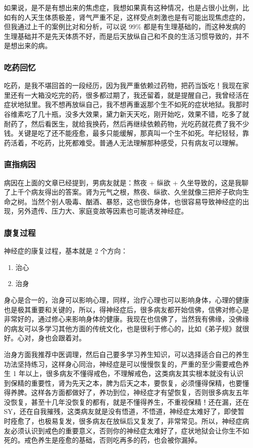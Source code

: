 \documentclass{ctexart}
\begin{document}
如果说，是不是有想出来的焦虑症，我想如果真有这种情况，也是占很小比例，比如有的人天生体质极差，肾气严重不足，这样受点刺激也是有可能出现焦虑症的，但我通过上千的案例比对和分析，可以说 99\% 都是有生理基础的，而这种发病的生理基础并不是先天体质不好，而是后天放纵自己和不良的生活习惯导致的，并不是想出来的病。

\subsubsection{吃药回忆}

吃药，是我不堪回首的一段经历，因为我严重依赖过药物，把药当饭吃！我现在家里还有一大箱没吃完的药，很多都过期了，我还留着，就是提醒自己，我曾经活在症状地狱里。我不想再放纵自己，我不想再重返那个生不如死的症状地狱。我那时谷维素吃了几十瓶，没多大效果，黛力新天天吃，刚开始吃，效果不错，吃多了就耐药了，然后看医生，就给我换药，然后再继续依赖药物，光吃药就花费了我不少钱。关键是吃了还不能痊愈，最多只能缓解，那真叫一个生不如死。年纪轻轻，靠药活着，不吃药，比死都难受。普通人无法理解那种感受，只有病友可以理解。

\subsubsection{直指病因}

病因在上面的文章已经提到，男病友就是：熬夜 + 纵欲 + 久坐导致的，这是我聊了上千个病友得出的答案。肾为元气之根，熬夜、纵欲、久坐就像三把斧子砍向生命之树。当然个别人吸毒、酗酒、暴怒，这也很伤身体，也很容易导致神经症的出现，另外遗传、压力大、家庭变故等因素也可能诱发神经症。

\subsubsection{康复过程}

神经症的康复过程，基本就是 2 个方向：

\begin{enumerate}
    \item 治心
    \item 治身
\end{enumerate}

身心是合一的，治身可以影响心理，同样，治疗心理也可以影响身体，心理的健康也是极其重要和关键的，所以，得神经症后，很多病友都开始信佛，信佛对修心是非常好的，通过修心来影响身体的健康。我现在也信佛了，当然我有佛缘，没佛缘的病友可以多学习其他方面的传统文化，也是很利于修心的，比如《弟子规》就很好。心对，身也会跟着对。

治身方面我推荐中医调理，然后自己要多学习养生知识，可以选择适合自己的养生功法坚持练习，这样身心同治，神经症是可以慢慢恢复的，严重的至少需要戒色养生 1 年以上，很多病友不懂得戒色，不理解戒色，这类病友其实根本就没有认识到保精的重要性，肾为先天之本，脾为后天之本，要恢复，必须懂得保精，也要懂得养脾。这样各方面都做好了，养功到位，神经症才有望恢复，否则很多病友五年没恢复，甚至十几年没恢复的都有，就是不懂得养生，不重视保精！还在漏，还在 SY，还在自我摧残，这类病友就是没有悟道，不悟道，神经症太难好了，即使暂时痊愈了，也极易复发，很多病友在放纵后又复发了，非常常见。所以，神经症病友必须认识到戒色的重要意义，否则你的神经症太难好了，症状地狱会让你生不如死的。戒色养生是痊愈的基础，否则吃再多的药，也会被你漏掉。
\end{document}
